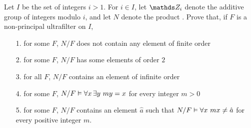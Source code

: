 \begin{exercise}
Let $I$ be the set of integers $i>1$.
For $i\in I$, let $\ZZ_i$ denote the additive group of integers modulo $i$, and let $N$ denote the product .
Prove that, if $F$ is a non-principal ultrafilter on $I$,

\begin{itemize}
\item[1.] for some $F$, $N/F$ does not contain any element of finite order
\item[2.] for some $F$, $N/F$ has some elements of order $2$
\item[3.] for all $F$, $N/F$ contains an element of infinite order
\item[4.] for some $F$, $N/F\vDash \forall x\,\exists y\ my=x$ for every integer $m>0$
\item[5.] for some $F$, $N/F$ contains an element $\hat a$ such that $N/F\vDash \forall x\ mx\neq\hat a$ for every positive integer $m$.
\end{itemize}
\begin{comment}
\textbf{Soluzione.} Dimostriamo \ssf{1} osservando che $\ZZ_i\models\neg\E x\,[x\neq 0 \wedge mx=0]$  per ogni intero $m$ ed ogni primo $i\nmid m$.
Quindi, se $F$ \`e un un ultrafiltro non principale che contiene l'insieme dei numeri primi, $N/F\models\neg\E x\,[x\neq 0 \wedge mx=0]$ per ogni $m$.
Per dimostrare \ssf{2} osserviamo che $\ZZ_{2i}\models\E x\,[x\neq 0 \wedge 2x=0]$ per ogni $i$.
Quindi se $F$ contiene l'insieme dei numeri pari, $N/F$ contiene un elemento di ordine 2.
Per dimostrare \ssf{3} sia $\hat a\in N$ la sequenza che ha valore costante $1$.
Chiaramente $\ZZ_i\models m\neq0$ per ogni intero positivo $m$ ed ogni $i>m$.
Quindi, se $F$ contiene il filtro di Fr\'echet, $N/F\models m [\hat a]_F\neq 0$ per ogni intero positivo $m$.
Dimostriamo \ssf{4} osservando che  $\ZZ_i\models\A x\,\E y\ my=x$ per ogni intero $m$ ed ogni primo $i\nmid m$.
Quindi se $F$ \`e un ultrafiltro non principale che contiene l'insieme dei numeri primi,  $N/F\models\A x\,\E y\ my=x$ per ogni $m$.
Dimostriamo \ssf{5}.
Sia $F$ un ultrafiltro non principale che contiene l'insieme $\{i\,!:i\in I\}$ e sia $\hat a$ la sequenza che ha valore costante $1$.
Poich\'e $\ZZ_{i\,!}\models\neg\E x\ mx=1$ per ogni $i>m$, otteniamo $N/F\models\neg\E x\ mx=[\hat a]_F$ per ogni $m>1$.
\end{comment}
\end{exercise}

